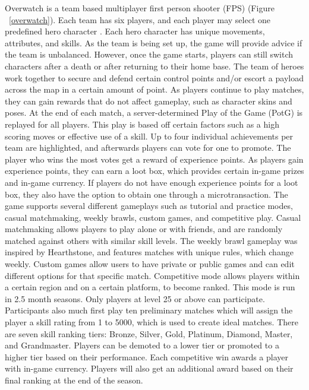 Overwatch is a team based multiplayer first person shooter (FPS) (Figure ~\ref{overwatch}). Each team has six players, and each player may select one predefined hero character \cite{Overwatch}. Each hero character has unique movements, attributes, and skills. As the team is being set up, the game will provide advice if the team is unbalanced. However, once the game starts, players can still switch characters after a death or after returning to their home base. The team of heroes work together to secure and defend certain control points and/or escort a payload across the map in a certain amount of point. As players continue to play matches, they can gain rewards that do not affect gameplay, such as character skins and poses. At the end of each match, a server-determined Play of the Game (PotG) is replayed for all players. This play is based off certain factors such as a high scoring moves or effective use of a skill. Up to four individual achievements per team are highlighted, and afterwards players can vote for one to promote. The player who wins the most votes get a reward of experience points. 
	As players gain experience points, they can earn a loot box, which provides certain in-game prizes and in-game currency. If players do not have enough experience points for a loot box, they also have the option to obtain one through a microtransaction. 
	The game supports several different gameplays such as tutorial and practice modes, casual matchmaking, weekly brawls, custom games, and competitive play. Casual matchmaking allows players to play alone or with friends, and are randomly matched against others with similar skill levels. The weekly brawl gameplay was inspired by Hearthstone, and features matches with unique rules, which change weekly. Custom games allow users to have private or public games and can edit different options for that specific match. Competitive mode allows players within a certain region and on a certain platform, to become ranked. This mode is run in 2.5 month seasons. Only players at level 25 or above can participate. Participants also much first play ten preliminary matches which will assign the player a skill rating from 1 to 5000, which is used to create ideal matches. There are seven skill ranking tiers: Bronze, Silver, Gold, Platinum, Diamond, Master, and Grandmaster. Players can be demoted to a lower tier or promoted to a higher tier based on their performance. Each competitive win awards a player with in-game currency. Players will also get an additional award based on their final ranking at the end of the season. 
	
